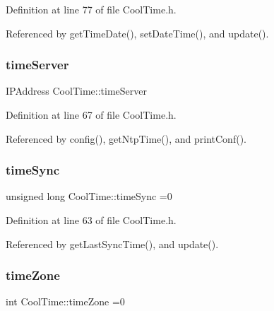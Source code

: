 Definition at line 77 of file Cool\+Time.\+h.



Referenced by get\+Time\+Date(), set\+Date\+Time(), and update().

\mbox{\label{classCoolTime_ad2b9858f399108cb440dd1e908916f04}} 
\subsubsection{\texorpdfstring{time\+Server}{timeServer}}
{\footnotesize\ttfamily I\+P\+Address Cool\+Time\+::time\+Server\hspace{0.3cm}{\ttfamily [private]}}



Definition at line 67 of file Cool\+Time.\+h.



Referenced by config(), get\+Ntp\+Time(), and print\+Conf().

\mbox{\label{classCoolTime_a9d032e76c3470a15b3bbbc52af6463f7}} 
\subsubsection{\texorpdfstring{time\+Sync}{timeSync}}
{\footnotesize\ttfamily unsigned long Cool\+Time\+::time\+Sync =0\hspace{0.3cm}{\ttfamily [private]}}



Definition at line 63 of file Cool\+Time.\+h.



Referenced by get\+Last\+Sync\+Time(), and update().

\mbox{\label{classCoolTime_a1916d98810c2a4e9ba72867e8c1b9a99}} 
\subsubsection{\texorpdfstring{time\+Zone}{timeZone}}
{\footnotesize\ttfamily int Cool\+Time\+::time\+Zone =0\hspace{0.3cm}{\ttfamily [private]}}



